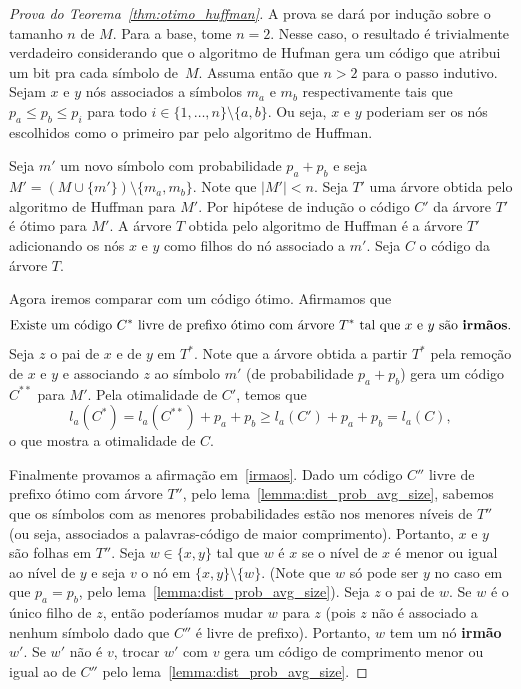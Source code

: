 \begin{proof}[Prova do Teorema~\ref{thm:otimo_huffman}]
A prova se dará por indução sobre o tamanho $n$ de $M$. Para a base,
tome $n=2$. Nesse caso, o resultado é trivialmente verdadeiro
considerando que o algoritmo de Hufman gera um código que atribui um
bit pra cada símbolo de~$M$. Assuma então que $n>2$ para o passo
indutivo. Sejam $x$ e $y$ nós associados a símbolos $m_a$ e $m_b$
respectivamente tais que $p_a \leq p_b \leq p_i$ para todo $i \in
\{1,\dotsc,n\}\setminus\{a,b\}$. Ou seja, $x$ e $y$ poderiam ser os nós escolhidos como o primeiro par pelo algoritmo de Huffman.

Seja $m'$ um novo símbolo com probabilidade $p_a+p_b$ e seja $M' =
(M\cup\{m'\})\setminus\{m_a, m_b\}$. Note que $|M'| < n$. Seja $T'$
uma árvore obtida pelo algoritmo de Huffman para $M'$. Por hipótese de
indução o código $C'$ da árvore $T'$ é ótimo para $M'$. A árvore $T$
obtida pelo algoritmo de Huffman é a árvore $T'$ adicionando os nós
$x$ e $y$ como filhos do nó associado a $m'$. Seja $C$ o código da
árvore $T$.

Agora iremos comparar com um código ótimo. Afirmamos que
\begin{equation}
 \label{irmaos}
\text{Existe um código $C^*$ livre de prefixo ótimo com árvore $T^*$
  tal que $x$ e $y$ são \textbf{irmãos}.}
\end{equation}
Seja $z$ o pai de $x$ e de $y$ em $T^*$. Note que a árvore obtida a
partir $T^*$ pela remoção de $x$ e $y$ e associando $z$ ao símbolo
$m'$ (de probabilidade $p_a+p_b$) gera um código $C^{**}$ para $M'$. Pela
otimalidade de $C'$, temos que
\begin{equation*}
  l_a(C^*)
  =
   l_a(C^{**})+p_a+p_b
  \geq
  l_a(C')+p_a+p_b
  =
  l_a(C),
\end{equation*}
o que mostra a otimalidade de $C$.


Finalmente provamos a afirmação em~\eqref{irmaos}.  Dado um código
$C''$ livre de prefixo ótimo com árvore $T''$, pelo
lema~\ref{lemma:dist_prob_avg_size}, sabemos que os símbolos com as
menores probabilidades estão nos menores níveis de $T''$ (ou seja,
associados a palavras-código de maior comprimento). Portanto, $x$ e
$y$ são folhas em $T''$. Seja $w \in\{x,y\}$ tal que $w$ é $x$ se o
nível de $x$ é menor ou igual ao nível de $y$ e seja $v$ o nó em
$\{x,y\}\setminus\{w\}$. (Note que $w$ só pode ser $y$ no caso em que
$p_a = p_b$, pelo lema~\ref{lemma:dist_prob_avg_size}). Seja $z$ o pai
de $w$. Se $w$ é o único filho de $z$, então poderíamos mudar $w$ para
$z$ (pois $z$ não é associado a nenhum símbolo dado que $C''$ é livre
de prefixo). Portanto, $w$ tem um nó \textbf{irmão} $w'$. Se $w'$ não
é $v$, trocar $w'$ com $v$ gera um código de comprimento menor ou
igual ao de $C''$ pelo lema~\ref{lemma:dist_prob_avg_size}. 
\end{proof}


